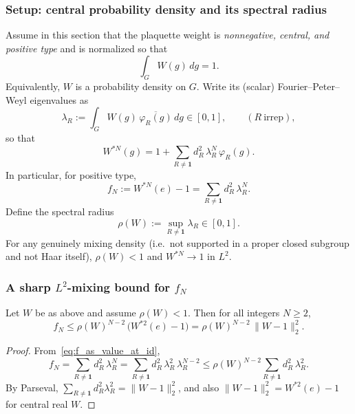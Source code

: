 \subsubsection{Setup: central probability density and its spectral radius}

Assume in this section that the plaquette weight is \emph{nonnegative, central, and positive type} and is
normalized so that
\begin{equation}
\int_G W(g)\,dg = 1.
\end{equation}
Equivalently, $W$ is a probability density on $G$.
Write its (scalar) Fourier--Peter--Weyl eigenvalues as
\begin{equation}
\lambda_R := \int_G W(g)\,\overline{\varphi_R(g)}\,dg \in [0,1],
\qquad (R\ \text{irrep}),
\end{equation}
so that
\begin{equation}
W^{*N}(g)=1+\sum_{R\ne\mathbf 1} d_R^2\,\lambda_R^{N}\,\varphi_R(g).
\end{equation}
In particular, for positive type,
\begin{equation}\label{eq:f_as_value_at_id}
f_N := W^{*N}(e)-1 = \sum_{R\ne\mathbf 1} d_R^2\,\lambda_R^{N}.
\end{equation}
Define the spectral radius
\begin{equation}
\rho(W):=\sup_{R\ne\mathbf 1}\lambda_R \in [0,1].
\end{equation}
For any genuinely mixing density (i.e.\ not supported in a proper closed subgroup and not Haar itself),
$\rho(W)<1$ and $W^{*N}\to 1$ in $L^2$.

\subsubsection{A sharp \texorpdfstring{$L^2$}{L2}-mixing bound for \texorpdfstring{$f_N$}{f\_N}}

\begin{proposition}\label{prop:mixing_bound}
Let $W$ be as above and assume $\rho(W)<1$.
Then for all integers $N\ge 2$,
\begin{equation}\label{eq:mixing_bound}
f_N \le \rho(W)^{N-2}\,\bigl(W^{*2}(e)-1\bigr)
= \rho(W)^{N-2}\,\|W-1\|_2^2.
\end{equation}
\end{proposition}
\begin{proof}
From~\eqref{eq:f_as_value_at_id},
\[
f_N=\sum_{R\ne\mathbf 1} d_R^2\,\lambda_R^{N}
=\sum_{R\ne\mathbf 1} d_R^2\,\lambda_R^{2}\,\lambda_R^{N-2}
\le \rho(W)^{N-2}\sum_{R\ne\mathbf 1} d_R^2\,\lambda_R^{2}.
\]
By Parseval,
$\sum_{R\ne\mathbf 1} d_R^2\lambda_R^2 = \|W-1\|_2^2$,
and also $\|W-1\|_2^2=W^{*2}(e)-1$ for central real $W$.
\end{proof}

